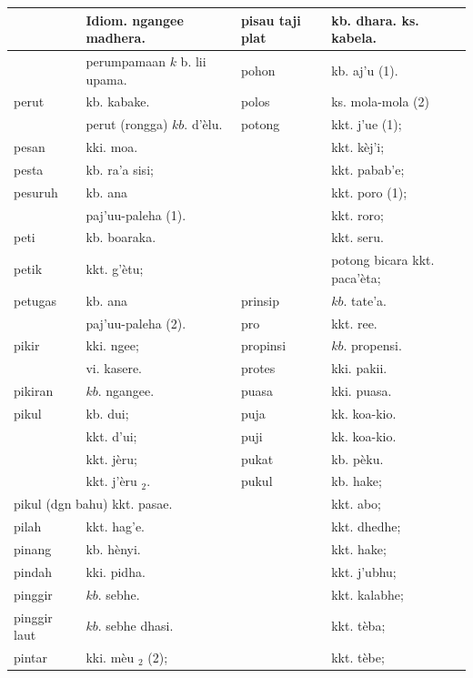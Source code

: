 \documentclass[10pt]{article}
\begin{document}
\begin{center}
\begin{tabular}{|l|l|l|l|}
\hline
 & Idiom. ngangee madhera. & pisau taji plat & kb. dhara. ks. kabela. \\
\hline
 & perumpamaan \(k\) b. lii upama. & pohon & kb. aj'u (1). \\
\hline
perut & kb. kabake. & polos & ks. mola-mola (2) \\
\hline
 & perut (rongga) \(k b\). d'èlu. & potong & kkt. j'ue (1); \\
\hline
pesan & kki. moa. &  & kkt. kèj'i; \\
\hline
pesta & kb. ra'a sisi; &  & kkt. pabab'e; \\
\hline
pesuruh & kb. ana &  & kkt. poro (1); \\
\hline
 & paj'uu-paleha (1). &  & kkt. roro; \\
\hline
peti & kb. boaraka. &  & kkt. seru. \\
\hline
petik & kkt. g'ètu; &  & potong bicara kkt. paca'èta; \\
\hline
petugas & kb. ana & prinsip & \(k b\). tate'a. \\
\hline
 & paj'uu-paleha (2). & pro & kkt. ree. \\
\hline
pikir & kki. ngee; & propinsi & \(k b\). propensi. \\
\hline
 & vi. kasere. & protes & kki. pakii. \\
\hline
pikiran & \(k b\). ngangee. & puasa & kki. puasa. \\
\hline
pikul & kb. dui; & puja & kk. koa-kio. \\
\hline
 & kkt. d'ui; & puji & kk. koa-kio. \\
\hline
 & kkt. jèru; & pukat & kb. pèku. \\
\hline
 & kkt. j'èru \({ }_{2}\). & pukul & kb. hake; \\
\hline
\multicolumn{2}{|l|}{pikul (dgn bahu) kkt. pasae.} &  & kkt. abo; \\
\hline
pilah & kkt. hag'e. &  & kkt. dhedhe; \\
\hline
pinang & kb. hènyi. &  & kkt. hake; \\
\hline
pindah & kki. pidha. &  & kkt. j'ubhu; \\
\hline
pinggir & \(k b\). sebhe. &  & kkt. kalabhe; \\
\hline
pinggir laut & \(k b\). sebhe dhasi. &  & kkt. tèba; \\
\hline
pintar & kki. mèu \({ }_{2}\) (2); &  & kkt. tèbe; \\

\end{tabular}
\end{center}
\end{document}
